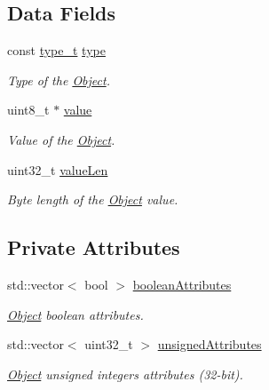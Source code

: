 \subsection*{Data Fields}
\begin{DoxyCompactItemize}
\item 
\hypertarget{classObject_ad90c5daa6f5dfb0a60a2c8cdecd4444f}{}const \hyperlink{object_8hpp_adee610a3c7375031538811d29f6a4124}{type\+\_\+t} \hyperlink{classObject_ad90c5daa6f5dfb0a60a2c8cdecd4444f}{type}\label{classObject_ad90c5daa6f5dfb0a60a2c8cdecd4444f}

\begin{DoxyCompactList}\small\item\em Type of the \hyperlink{classObject}{Object}. \end{DoxyCompactList}\item 
\hypertarget{classObject_a528d047a03a99189b3f993eefe31ef9f}{}uint8\+\_\+t $\ast$ \hyperlink{classObject_a528d047a03a99189b3f993eefe31ef9f}{value}\label{classObject_a528d047a03a99189b3f993eefe31ef9f}

\begin{DoxyCompactList}\small\item\em Value of the \hyperlink{classObject}{Object}. \end{DoxyCompactList}\item 
\hypertarget{classObject_a07a367dee2fb2fff5515654dc0555735}{}uint32\+\_\+t \hyperlink{classObject_a07a367dee2fb2fff5515654dc0555735}{value\+Len}\label{classObject_a07a367dee2fb2fff5515654dc0555735}

\begin{DoxyCompactList}\small\item\em Byte length of the \hyperlink{classObject}{Object} value. \end{DoxyCompactList}\end{DoxyCompactItemize}
\subsection*{Private Attributes}
\begin{DoxyCompactItemize}
\item 
\hypertarget{classObject_a5bb173159959aafc3521727c8c9377dd}{}std\+::vector$<$ bool $>$ \hyperlink{classObject_a5bb173159959aafc3521727c8c9377dd}{boolean\+Attributes}\label{classObject_a5bb173159959aafc3521727c8c9377dd}

\begin{DoxyCompactList}\small\item\em \hyperlink{classObject}{Object} boolean attributes. \end{DoxyCompactList}\item 
\hypertarget{classObject_a125a2a3b379cd57d885e5060422b58d3}{}std\+::vector$<$ uint32\+\_\+t $>$ \hyperlink{classObject_a125a2a3b379cd57d885e5060422b58d3}{unsigned\+Attributes}\label{classObject_a125a2a3b379cd57d885e5060422b58d3}

\begin{DoxyCompactList}\small\item\em \hyperlink{classObject}{Object} unsigned integers attributes (32-\/bit). \end{DoxyCompactList}\end{DoxyCompactItemize}


